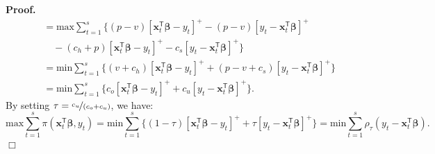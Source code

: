 \documentclass[a4paper,11pt]{article}
\newenvironment{proof}
 {\begin{trivlist} \item[] {\bf Proof.\ }}{\hfill$\Box$ \end{trivlist}}
\begin{document}
\begin{proof}
\[\begin{aligned}
        &\quad=\text{max}\displaystyle\sum_{t=1}^s\{(p-v)[\mathbf{x}_t^{\mathsf{T}}\boldsymbol{\beta}-y_t]^+-(p-v)[y_t-\mathbf{x}_t^{\mathsf{T}}\boldsymbol{\beta}]^+\\
        &\qquad-(c_h+p)[\mathbf{x}_t^{\mathsf{T}}\boldsymbol{\beta}-y_t]^+-c_s[y_t-\mathbf{x}_t^{\mathsf{T}}\boldsymbol{\beta}]^+\}\\
        &\quad=\text{min}\displaystyle\sum_{t=1}^s\{(v+c_h)[\mathbf{x}_t^{\mathsf{T}}\boldsymbol{\beta}-y_t]^++(p-v+c_s)[y_t-\mathbf{x}_t^{\mathsf{T}}\boldsymbol{\beta}]^+\}\\
        &\quad=\text{min}\displaystyle\sum_{t=1}^s\{c_o[\mathbf{x}_t^{\mathsf{T}}\boldsymbol{\beta}-y_t]^++c_u[y_t-\mathbf{x}_t^{\mathsf{T}}\boldsymbol{\beta}]^+\}.
    \end{aligned}
\]
By setting $\tau=\nicefrac{c_u}{(c_o+c_u)}$, we have:
\[
    \text{max}\displaystyle\sum_{t=1}^s{\pi(\mathbf{x}_t^{\mathsf{T}}\boldsymbol{\beta},y_t)}=\text{min}\displaystyle\sum_{t=1}^s\{(1-\tau)[\mathbf{x}_t^{\mathsf{T}}\boldsymbol{\beta}-y_t]^++\tau[y_t-\mathbf{x}_t^{\mathsf{T}}\boldsymbol{\beta}]^+\}=\text{min}\displaystyle\sum_{t=1}^s\rho_{\tau}(y_t-\mathbf{x}_t^{\mathsf{T}}\boldsymbol{\beta}).
\]
\end{proof}


\printbibliography
\end{document}
